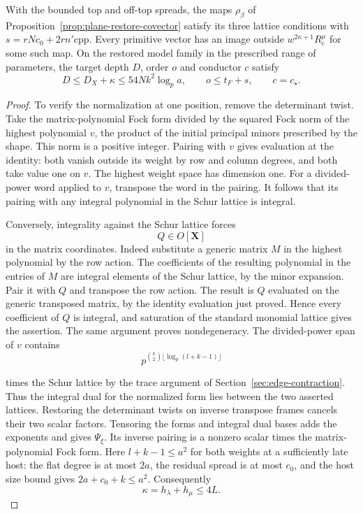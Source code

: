 \begin{proposition}\label{prop:plane-bounded-weight-operators}
With the bounded top and off-top spreads, the maps
\(\rho_\beta\) of Proposition~\ref{prop:plane-restore-covector}
satisfy its three lattice conditions with
\(s=rNc_0+2rn'\mathrm{cpp}\). Every primitive vector
has an image outside \(w^{2\kappa+1}R_e^\mu\) for some
such map. On the restored model family in the prescribed range of parameters, the target depth \(D\), order \(o\) and conductor \(c\) satisfy
\[
 D\le D_X+\kappa\le54Nk^2\log_p a,\qquad o\le t_F+s,\qquad c=c_\star.
\]

\end{proposition}

\begin{proof}
To verify the normalization at one position, remove the determinant
twist. Take the matrix-polynomial Fock form divided by the
squared Fock norm of the highest polynomial \(v\), the product
of the initial principal minors prescribed by the shape.
This norm is a positive integer. Pairing with \(v\) gives evaluation
at the identity: both vanish outside its weight by row and column
degrees, and both take value one on \(v\). The highest weight
space has dimension one. For a divided-power word applied to
\(v\), transpose the word in the pairing. It follows that its
pairing with any integral polynomial in the Schur lattice is
integral.

Conversely, integrality against the Schur lattice forces
\[
 Q\in O[\mathbf X]
\]
in the matrix coordinates.
Indeed substitute a generic matrix \(M\) in the highest polynomial
by the row action. The coefficients of the resulting polynomial
in the entries of \(M\) are integral elements of the Schur
lattice, by the minor expansion. Pair it with \(Q\) and transpose
the row action. The result is \(Q\) evaluated on the generic
transposed matrix, by the identity evaluation just proved.
Hence every coefficient of \(Q\) is integral, and saturation
of the standard monomial lattice gives the assertion.
The same argument proves nondegeneracy. The divided-power span of
\(v\) contains
\[
 p^{\binom k2\lfloor\log_p(l+k-1)\rfloor}
\]

times the Schur lattice by the trace argument of
Section~\ref{sec:edge-contraction}. Thus the integral dual for the
normalized form lies between the two asserted lattices. Restoring
the determinant twists on inverse transpose frames cancels their
two scalar factors. Tensoring the forms and integral dual bases
adds the exponents and gives \(\Psi_\xi\). Its inverse pairing
is a nonzero scalar times the matrix-polynomial Fock form.
Here \(l+k-1\le a^2\) for both weights at a sufficiently late
host: the flat degree is at most \(2a\), the residual spread
is at most \(c_0\), and the host size bound gives
\(2a+c_0+k\le a^2\). Consequently
\[
 \kappa=h_\lambda+h_\mu\le4L.
\]


\end{proof}
